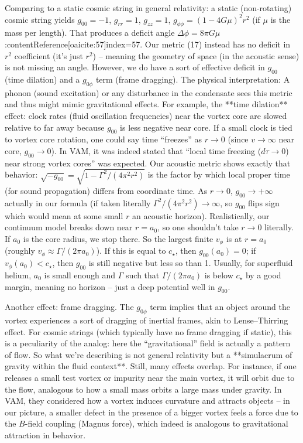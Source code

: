 \documentclass[12pt]{article}
\begin{document}
Comparing to a static cosmic string in general relativity: a static (non-rotating) cosmic string yields $g_{00}=-1$, $g_{rr}=1$, $g_{zz}=1$, $g_{\phi\phi} = (1-4G\mu)^2 r^2$ (if $\mu$ is the mass per length). That produces a deficit angle $\Delta \phi = 8\pi G \mu$:contentReference[oaicite:57]{index=57}. Our metric (17) instead has no deficit in $r^2$ coefficient (it’s just $r^2$) – meaning the geometry of space (in the acoustic sense) is not missing an angle. However, we do have a sort of effective deficit in $g_{00}$ (time dilation) and a $g_{0\phi}$ term (frame dragging). The physical interpretation: A phonon (sound excitation) or any disturbance in the condensate sees this metric and thus might mimic gravitational effects. For example, the **time dilation** effect: clock rates (fluid oscillation frequencies) near the vortex core are slowed relative to far away because $g_{00}$ is less negative near core. If a small clock is tied to vortex core rotation, one could say time “freezes” as $r\to 0$ (since $v\to \infty$ near core, $g_{00}\to 0$). In VAM, it was indeed stated that “local time freezing ($d\tau \to 0$) near strong vortex cores” was expected. Our acoustic metric shows exactly that behavior: $\sqrt{-g_{00}} = \sqrt{1 - \Gamma^2/(4\pi^2 r^2)}$ is the factor by which local proper time (for sound propagation) differs from coordinate time. As $r\to 0$, $g_{00}\to +\infty$ actually in our formula (if taken literally $\Gamma^2/(4\pi^2r^2)\to\infty$, so $g_{00}$ flips sign which would mean at some small $r$ an acoustic horizon). Realistically, our continuum model breaks down near $r=a_0$, so one shouldn’t take $r\to 0$ literally. If $a_0$ is the core radius, we stop there. So the largest finite $v_\phi$ is at $r = a_0$ (roughly $v_\phi \approx \Gamma/(2\pi a_0)$). If this is equal to $c_\star$, then $g_{00}(a_0)=0$; if $v_\phi(a_0)<c_\star$, then $g_{00}$ is still negative but less so than 1. Usually, for superfluid helium, $a_0$ is small enough and $\Gamma$ such that $\Gamma/(2\pi a_0)$ is below $c_\star$ by a good margin, meaning no horizon – just a deep potential well in $g_{00}$.

Another effect: frame dragging. The $g_{0\phi}$ term implies that an object around the vortex experiences a sort of dragging of inertial frames, akin to Lense–Thirring effect. For cosmic strings (which typically have no frame dragging if static), this is a peculiarity of the analog: here the “gravitational” field is actually a pattern of flow. So what we’re describing is not general relativity but a **simulacrum of gravity within the fluid context**. Still, many effects overlap. For instance, if one releases a small test vortex or impurity near the main vortex, it will orbit due to the flow, analogous to how a small mass orbits a large mass under gravity. In VAM, they considered how a vortex induces curvature and attracts objects – in our picture, a smaller defect in the presence of a bigger vortex feels a force due to the $B$-field coupling (Magnus force), which indeed is analogous to gravitational attraction in behavior. 
\end{document}
